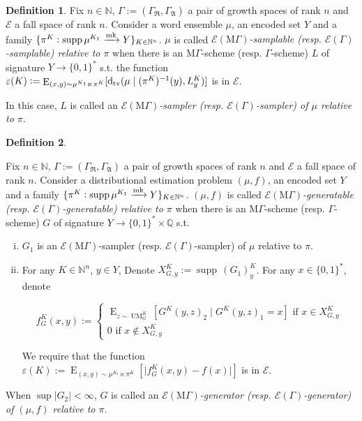 \documentclass{article}
\numberwithin{equation}{section}
\theoremstyle{definition}
\newtheorem{definition}{Definition}[section]
\theoremstyle{plain}
\newcommand{\Words}{{\{ 0, 1 \}^*}}
\DeclareMathOperator{\Supp}{supp}
\DeclareMathOperator{\E}{E}
\DeclareMathOperator{\UM}{UM}
\newcommand{\Dtv}{\operatorname{d}_{\textnormal{tv}}}
\newcommand{\Nats}{\mathbb{N}}
\newcommand{\Rats}{\mathbb{Q}}
\newcommand{\Abs}[1]{\lvert #1 \rvert}
\newcommand{\GrowR}{\Gamma_{\mathfrak{R}}}
\newcommand{\GrowA}{\Gamma_{\mathfrak{A}}}
\newcommand{\Grow}{\Gamma:=(\GrowR,\GrowA)}
\newcommand{\MGrow}{\mathrm{M}\Gamma}
\newcommand{\Fall}{\mathcal{E}}
\newcommand{\Markov}{\xrightarrow{\textnormal{mk}}}
\begin{document}
\begin{definition}

Fix $n \in \Nats$, $\Grow$ a pair of growth spaces of rank $n$ and $\Fall$ a fall space of rank $n$. Consider a word ensemble $\mu$, an encoded set $Y$ and a family ${\{\pi^K: \Supp \mu^{K_1} \Markov Y\}_{K \in \Nats^n}}$. $\mu$ is called \emph{$\Fall(\MGrow)$-samplable (resp. $\Fall(\Gamma)$-samplable) relative to $\pi$} when there is an $\MGrow$-scheme (resp. $\Gamma$-scheme) $L$ of signature $Y \rightarrow \Words$ s.t. the function ${\varepsilon(K):=\E_{(x,y) \sim \mu^{K_1} \ltimes \pi^K}[\Dtv(\mu \mid (\pi^K)^{-1}(y),L_y^K)]}$ is in $\Fall$.

In this case, $L$ is called an \emph{$\Fall(\MGrow)$-sampler (resp. $\Fall(\Gamma)$-sampler) of $\mu$ relative to $\pi$}.

\end{definition}

\begin{samepage}
\begin{definition}
\label{def:gen_rel}

Fix $n \in \Nats$, $\Grow$ a pair of growth spaces of rank $n$ and $\Fall$ a fall space of rank $n$. Consider a distributional estimation problem $(\mu,f)$, an encoded set $Y$ and a family $\{\pi^K: \Supp \mu^{K_1} \Markov Y\}_{K \in \Nats^n}$. $(\mu,f)$ is called \emph{$\Fall(\MGrow)$-generatable (resp. $\Fall(\Gamma)$-generatable) relative to $\pi$} when there is an $\MGrow$-scheme (resp. $\Gamma$-scheme) $G$ of signature $Y \rightarrow \Words \times \Rats$ s.t.

\begin{enumerate}[(i)]

\item $G_1$ is an $\Fall(\MGrow)$-sampler (resp. $\Fall(\Gamma)$-sampler) of $\mu$ relative to $\pi$.

\item For any $K \in \Nats^n$, $y \in Y$, Denote $X_{G,y}^K:=\Supp \, (G_1)_y^K$. For any ${x \in \Words}$, denote 

$$f_G^K(x,y):=\begin{cases}\E_{z \sim\UM_G^K}[G^K(y,z)_2 \mid G^K(y,z)_1 = x] \text{ if } x \in X_{G,y}^K \\ 0 \text{ if } x \not\in X_{G,y}^K \end{cases}$$

We require that the function ${\varepsilon(K):=\E_{(x,y) \sim \mu^{K_1} \ltimes \pi^K}[\Abs{f_G^K(x,y)-f(x)}]}$ is in $\Fall$.

\end{enumerate}

When $\sup{\Abs{G_2}} < \infty$, $G$ is called an \emph{$\Fall(\MGrow)$-generator (resp. $\Fall(\Gamma)$-generator) of $(\mu,f)$ relative to $\pi$}.

\end{definition}
\end{samepage}
\end{document}
